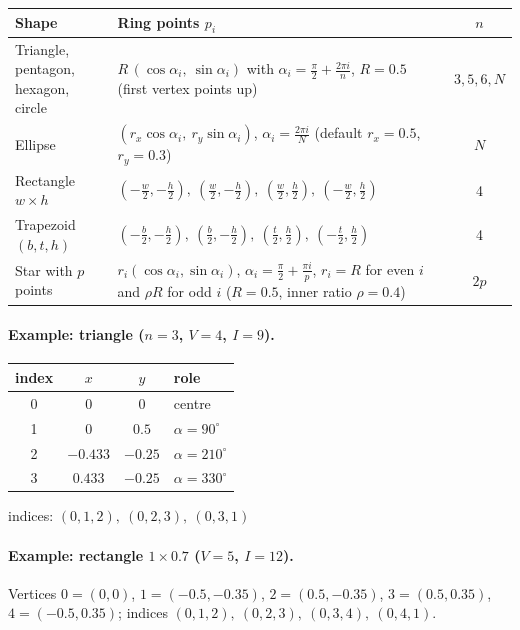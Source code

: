 \documentclass[a4paper, 11pt]{article}
\begin{document}
\begin{center}
\small
\begin{tabularx}{\textwidth}{@{}lXc@{}}
\toprule
\textbf{Shape} & \textbf{Ring points} $p_i$ & $n$\\
\midrule
Triangle, pentagon, hexagon, circle &
  $R\,(\cos\alpha_i,\ \sin\alpha_i)$ with $\alpha_i=\frac{\pi}{2}+\frac{2\pi i}{n}$, $R=0.5$ (first vertex points up)
  & $3,5,6,N$\\
Ellipse & $(r_x\cos\alpha_i,\ r_y\sin\alpha_i)$, $\alpha_i=\frac{2\pi i}{N}$ (default $r_x=0.5$, $r_y=0.3$) & $N$\\
Rectangle $w\times h$ & $(-\tfrac w2,-\tfrac h2),\ (\tfrac w2,-\tfrac h2),\ (\tfrac w2,\tfrac h2),\ (-\tfrac w2,\tfrac h2)$ & 4\\
Trapezoid $(b,t,h)$ & $(-\tfrac b2,-\tfrac h2),\ (\tfrac b2,-\tfrac h2),\ (\tfrac t2,\tfrac h2),\ (-\tfrac t2,\tfrac h2)$ & 4\\
Star with $p$ points &
  $r_i(\cos\alpha_i,\sin\alpha_i)$, $\alpha_i=\frac{\pi}{2}+\frac{\pi i}{p}$, $r_i=R$ for even $i$ and $\rho R$ for odd $i$
  ($R=0.5$, inner ratio $\rho=0.4$) & $2p$\\
\bottomrule
\end{tabularx}
\end{center}

\paragraph{Example: triangle ($n=3$, $V=4$, $I=9$).}
\begin{center}
\small
\begin{tabular}{@{}cccl@{}}
\toprule
index & $x$ & $y$ & role\\
\midrule
0 & $0$ & $0$ & centre\\
1 & $0$ & $0.5$ & $\alpha=90^\circ$\\
2 & $-0.433$ & $-0.25$ & $\alpha=210^\circ$\\
3 & $0.433$ & $-0.25$ & $\alpha=330^\circ$\\
\bottomrule
\end{tabular}
\qquad
\begin{minipage}[c]{5.2cm}
indices: $(0,1,2),\ (0,2,3),\ (0,3,1)$
\end{minipage}
\end{center}

\paragraph{Example: rectangle $1\times0.7$ ($V=5$, $I=12$).}
Vertices $0=(0,0)$, $1=(-0.5,-0.35)$, $2=(0.5,-0.35)$, $3=(0.5,0.35)$, $4=(-0.5,0.35)$;
indices $(0,1,2),\ (0,2,3),\ (0,3,4),\ (0,4,1)$.
\end{document}
